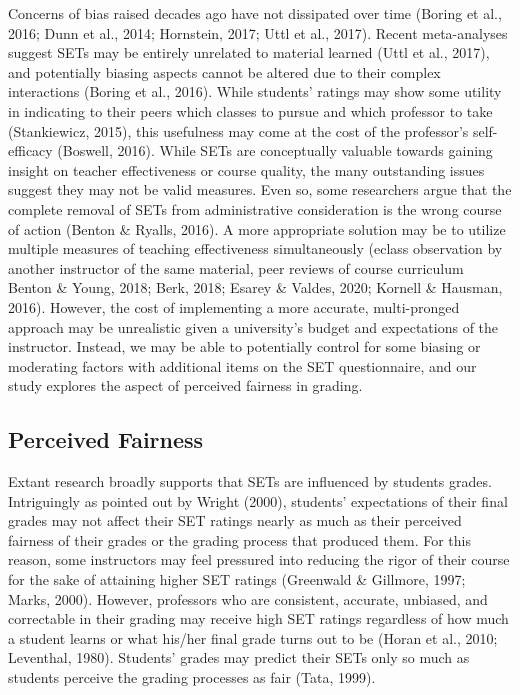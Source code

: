 \documentclass[
  man]{apa7}
\begin{document}
Concerns of bias raised decades ago have not dissipated over time (Boring et al., 2016; Dunn et al., 2014; Hornstein, 2017; Uttl et al., 2017). Recent meta-analyses suggest SETs may be
entirely unrelated to material learned (Uttl et al., 2017), and potentially
biasing aspects cannot be altered due to their complex interactions
(Boring et al., 2016). While students' ratings may show some utility in
indicating to their peers which classes to pursue and which professor to
take (Stankiewicz, 2015), this usefulness may come at the cost of the professor's
self-efficacy (Boswell, 2016). While SETs are conceptually valuable
towards gaining insight on teacher effectiveness or course quality, the
many outstanding issues suggest they may not be valid measures. Even so,
some researchers argue that the complete removal of SETs from
administrative consideration is the wrong course of action
(Benton \& Ryalls, 2016). A more appropriate solution may be to utilize multiple
measures of teaching effectiveness simultaneously (eclass observation by
another instructor of the same material, peer reviews of course curriculum Benton \& Young, 2018; Berk, 2018; Esarey \& Valdes, 2020; Kornell \& Hausman, 2016). However, the cost of implementing
a more accurate, multi-pronged approach may be unrealistic given a
university's budget and expectations of the instructor. Instead, we may be able to potentially control for some biasing or moderating factors with additional items on the SET questionnaire, and our study explores the aspect of perceived fairness in grading.

\subsection{Perceived Fairness}\label{perceived-fairness}

Extant research broadly supports that SETs are influenced by students grades. Intriguingly as pointed out by Wright (2000), students' expectations of their final grades may not affect their SET ratings nearly as much as their perceived fairness of their grades or the grading process that produced them. For this reason, some instructors may feel pressured into reducing the rigor of their course for the sake of attaining higher SET ratings (Greenwald \& Gillmore, 1997; Marks, 2000). However, professors who are consistent, accurate, unbiased, and correctable in their grading may receive high SET ratings regardless of how much a student learns or what his/her final grade turns out to be (Horan et al., 2010; Leventhal, 1980). Students' grades may predict their SETs only so much as students perceive the grading processes as fair (Tata, 1999).
\end{document}
